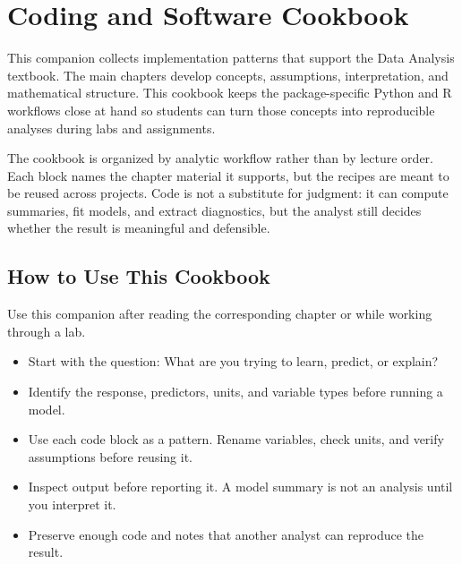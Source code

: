 \chapter{Coding and Software Cookbook}
\label{app:coding-software-cookbook}

This companion collects implementation patterns that support the Data Analysis textbook.  The main chapters develop concepts, assumptions, interpretation, and mathematical structure.  This cookbook keeps the package-specific Python and R workflows close at hand so students can turn those concepts into reproducible analyses during labs and assignments.

The cookbook is organized by analytic workflow rather than by lecture order.  Each block names the chapter material it supports, but the recipes are meant to be reused across projects.  Code is not a substitute for judgment: it can compute summaries, fit models, and extract diagnostics, but the analyst still decides whether the result is meaningful and defensible.

\section{How to Use This Cookbook}
\label{app:cookbook-how-to-use}

Use this companion after reading the corresponding chapter or while working through a lab.

\begin{itemize}
  \item Start with the question: What are you trying to learn, predict, or explain?
  \item Identify the response, predictors, units, and variable types before running a model.
  \item Use each code block as a pattern.  Rename variables, check units, and verify assumptions before reusing it.
  \item Inspect output before reporting it.  A model summary is not an analysis until you interpret it.
  \item Preserve enough code and notes that another analyst can reproduce the result.
\end{itemize}

